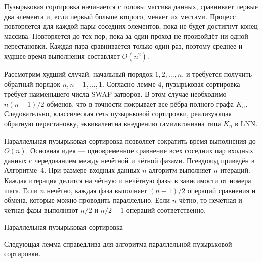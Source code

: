 Пузырьковая сортировка начинается с головы массива данных, сравнивает первые
два элемента и, если первый больше второго, меняет их местами. Процесс
повторяется для каждой пары соседних элементов, пока не будет достигнут конец
массива. Повторяется до тех пор, пока за один проход не произойдёт ни одной
перестановки. Каждая пара сравнивается только один раз, поэтому среднее и
худшее время выполнения составляет $O(n^2)$.

Рассмотрим худший случай: начальный порядок $1, 2, \dots, n$, и требуется
получить обратный порядок $n, n-1, \dots, 1$. Согласно лемме 4, пузырьковая
сортировка требует наименьшего числа SWAP-затворов. В этом случае необходимо
$n(n-1)/2$ обменов, что в точности покрывает все рёбра полного графа $K_n$.
Следовательно, классическая сеть пузырьковой сортировки, реализующая обратную
перестановку, эквивалентна внедрению гамильтониана типа $K_n$ в LNN.

Параллельная пузырьковая сортировка позволяет сократить время выполнения до
$O(n)$. Основная идея — одновременное сравнение всех соседних пар входных
данных с чередованием между нечётной и чётной фазами. Псевдокод приведён в
Алгоритме~4. При размере входных данных $n$ алгоритм выполняет $n$ итераций.
Каждая итерация делится на чётную и нечётную фазы в зависимости от номера шага.
Если $n$ нечётно, каждая фаза выполняет $(n - 1)/2$ операций сравнения и
обмена, которые можно проводить параллельно. Если $n$ чётно, то нечётная и
чётная фазы выполняют $n/2$ и $n/2 - 1$ операций соответственно.

\begin{algorithm}[htp!]
    \SetAlgoLined



    \caption{Параллельная пузырьковая сортировка}
    \label{alg:parallelBubble}
\end{algorithm}

Следующая лемма справедлива для алгоритма параллельной пузырьковой сортировки.

